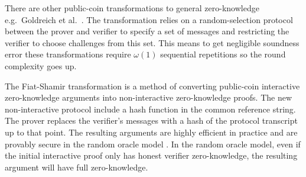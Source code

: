 There are other public-coin transformations to general zero-knowledge e.g.~Goldreich et al.~\cite{GoldreichSV98}. The transformation relies on a random-selection protocol between the prover and verifier to specify a set of messages and restricting the verifier to choose challenges from this set. This means to get negligible soundness error these transformations require $\omega(1)$ sequential repetitions so the round complexity goes up.

The Fiat-Shamir transformation \cite{FiatShamir} is a method of converting public-coin interactive zero-knowledge arguments into non-interactive zero-knowledge proofs. The new non-interactive protocol include a hash function in the common reference string. The prover replaces the verifier's messages with a hash of the protocol transcript up to that point. The resulting arguments are highly efficient in practice and are provably secure in the random oracle model \cite{bellarerogaway}. In the random oracle model, even if the initial interactive proof only has honest verifier zero-knowledge, the resulting argument will have full zero-knowledge.


